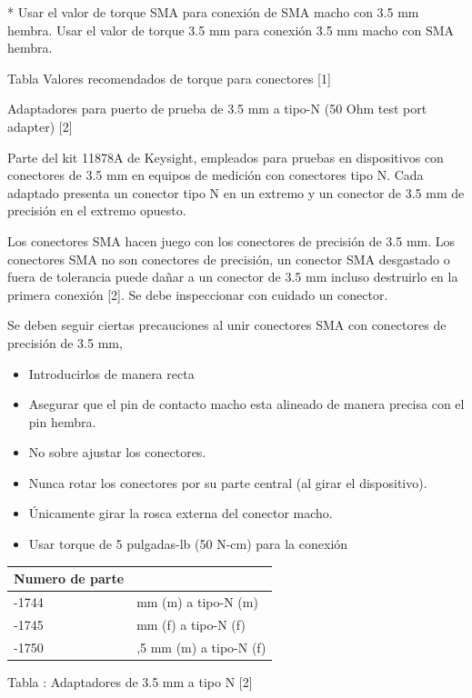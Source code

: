 \documentclass{article}
\begin{document}
	* Usar el valor de torque SMA para conexión de SMA macho con 3.5 mm hembra. Usar el valor de torque 3.5 mm para conexión
	3.5 mm macho con SMA hembra.
	
	Tabla Valores recomendados de torque para conectores [1]
	
	Adaptadores para puerto de prueba de 3.5 mm a tipo-N (50 Ohm test port adapter) [2]
	
	Parte del kit 11878A de Keysight, empleados para pruebas en dispositivos con conectores de 3.5 mm en equipos de medición
	con conectores tipo N. Cada adaptado presenta un conector tipo N en un extremo y un conector de 3.5 mm de precisión en
	el extremo opuesto.
	
	Los conectores SMA hacen juego con los conectores de precisión de 3.5 mm. Los conectores SMA no son conectores de
	precisión, un conector SMA desgastado o fuera de tolerancia puede dañar a un conector de 3.5 mm incluso destruirlo en
	la primera conexión [2]. Se debe inspeccionar con cuidado un conector.
	
	Se deben seguir ciertas precauciones al unir conectores SMA con conectores de precisión de 3.5 mm,
	
	\begin{itemize}
		\item Introducirlos de manera recta
		\item Asegurar que el pin de contacto macho esta alineado de manera precisa con el pin hembra.
		\item No sobre ajustar los conectores.
		\item Nunca rotar los conectores por su parte central (al girar el dispositivo).
		\item Únicamente girar la rosca externa del conector macho.
		\item Usar torque de 5 pulgadas-lb (50 N-cm) para la conexión
	\end{itemize}
	
	\begin{center}
		\tablefirsthead{}
		\tablehead{}
		\tabletail{}
		\tablelasttail{}
		\begin{supertabular}{|m{2.677cm}|m{3.793cm}|}
			\hline
			\centering Numero de parte &
			~
			\\\hline
			-1744 &
			 mm (m) a tipo-N (m)\\\hline
			-1745 &
			 mm (f) a tipo-N (f)\\\hline
			-1750 &
			,5 mm (m) a tipo-N (f)\\\hline
		\end{supertabular}
	\end{center}
	Tabla : Adaptadores de 3.5 mm a tipo N [2]	
	
\end{document}
